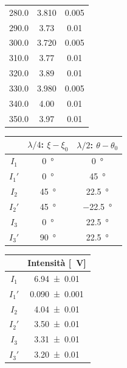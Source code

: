 \documentclass[10pt,oneside,a4paper]{article}
\begin{document}
\begin{minipage}[t]{0.3\linewidth}
\begin{center}
\begin{tabular}{c|c|c}
280.0 &    3.810 &            0.005 \\
290.0 &    3.73 &            0.01 \\
300.0 &    3.720 &            0.005 \\
310.0 &    3.77 &            0.01 \\
320.0 &    3.89 &            0.01 \\
330.0 &    3.980 &            0.005 \\
340.0 &    4.00 &            0.01 \\
350.0 &    3.97 &            0.01 \\
\bottomrule
\end{tabular}
\end{center}
\end{minipage}

\vspace{1cm}
\begin{minipage}[t]{.33\linewidth}
\begin{center}
\label{tab:misuraStokes}
\begin{tabular}{c|c|c}
 &  $\lambda / 4$: $\xi-\xi_0$ & $\lambda / 2$: $\theta-\theta_0$  \\
\hline
     $I_1$  &        \SI{0}{\degree} &         \SI{0}{\degree} \\
     $I_1'$  &       \SI{0}{\degree} &         \SI{45}{\degree} \\
     \hline 
     $I_2$  &        \SI{45}{\degree} &         \SI{22.5}{\degree} \\
     $I_2'$  &       \SI{45}{\degree} &         \SI{-22.5}{\degree} \\
     \hline 
     $I_3$  &        \SI{0}{\degree} &         \SI{22.5}{\degree} \\
     $I_3'$	&		 \SI{90}{\degree} &         \SI{22.5}{\degree} \\
\hline
\end{tabular}
\end{center}
\end{minipage}
\hspace{1em}
\begin{minipage}[t]{.33\linewidth}
\begin{center}
\label{tab:stokesBS}
\begin{tabular}{c|c}
& Intensità [\SI{}{V}]  \\
\hline
     $I_1$  &        \SI{6.94 \pm 0.01}{} \\
     $I_1'$  &       \SI{0.090 \pm 0.001}{} \\
     \hline 
     $I_2$  &        \SI{4.04 \pm 0.01}{} \\
     $I_2'$  &       \SI{3.50 \pm 0.01}{} \\
     \hline 
     $I_3$  &        \SI{3.31 \pm 0.01}{} \\
     $I_3'$	&		 \SI{3.20 \pm 0.01}{} \\
\hline
\end{tabular}
\end{center}
\end{minipage}
\end{document}
